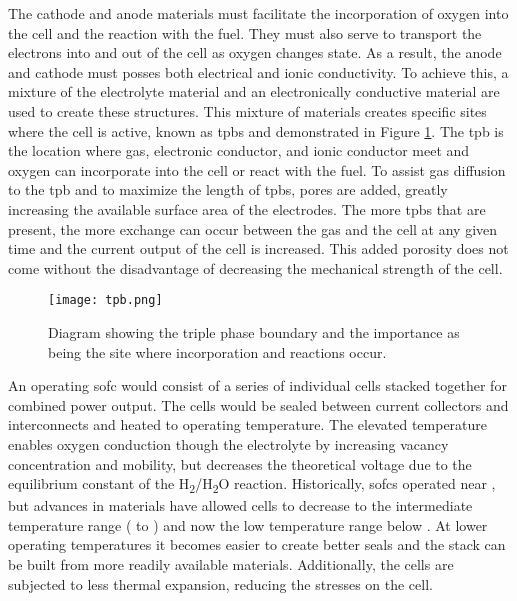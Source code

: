     The cathode and anode materials must facilitate the incorporation of oxygen into the cell and the reaction with the fuel.
    They must also serve to transport the electrons into and out of the cell as oxygen changes state.
    As a result, the anode and cathode must posses both electrical and ionic conductivity.
    To achieve this, a mixture of the electrolyte material and an electronically conductive material are used to create these structures.
    This mixture of materials creates specific sites where the cell is active, known as \glspl{tpb} and demonstrated in Figure \ref{fig:tpb}.
    The \gls{tpb} is the location where gas, electronic conductor, and ionic conductor meet and oxygen can incorporate into the cell or react with the fuel.
    To assist gas diffusion to the \gls{tpb} and to maximize the length of \glspl{tpb}, pores are added, greatly increasing the available surface area of the electrodes.
    The more \glspl{tpb} that are present, the more exchange can occur between the gas and the cell at any given time and the current output of the cell is increased.
    This added porosity does not come without the disadvantage of decreasing the mechanical strength of the cell.\cite{Pihlatie2009,Laurencin2010}
    \begin{figure}[p]
      \centering
      \texttt{[image: tpb.png]}
      \caption[Diagram showing the triple phase boundary and the importance as being the site where incorporation and reactions occur.]{Diagram showing the triple phase boundary and the importance as being the site where incorporation and reactions occur.\cite{Wachsman2011a}}\label{fig:tpb}
    \end{figure}

    An operating \gls{sofc} would consist of a series of individual cells stacked together for combined power output.
    The cells would be sealed between current collectors and interconnects and heated to operating temperature.
    The elevated temperature enables oxygen conduction though the electrolyte by increasing vacancy concentration and mobility, but decreases the theoretical voltage due to the equilibrium constant of the H\textsubscript{2}/H\textsubscript{2}O reaction.
    Historically, \glspl{sofc} operated near , but advances in materials have allowed cells to decrease to the intermediate temperature range ( to ) and now the low temperature range below .\cite{Wachsman2011a}
    At lower operating temperatures it becomes easier to create better seals and the stack can be built from more readily available materials.%
    Additionally, the cells are subjected to less thermal expansion, reducing the stresses on the cell.

